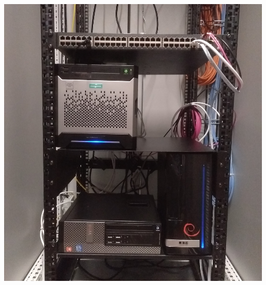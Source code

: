 \documentclass{beamer}
\begin{document}
	\begin{frame}
		\centering
		\includegraphics[height=\textheight]{media/zbau-server-neu.jpg}
	\end{frame}
\end{document}
